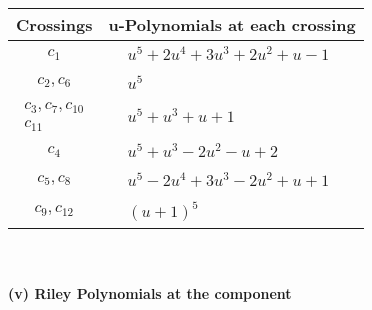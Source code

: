 \documentclass[1p]{elsarticle_modified}
\theoremstyle{definition}
\begin{document}
\begin{tabular}{m{50pt}|m{274pt}}
Crossings & \hspace{64pt}u-Polynomials at each crossing \\
\hline $$\begin{aligned}c_{1}\end{aligned}$$&$\begin{aligned}
&u^5+2 u^4+3 u^3+2 u^2+u-1
\end{aligned}$\\
\hline $$\begin{aligned}c_{2},c_{6}\end{aligned}$$&$\begin{aligned}
&u^5
\end{aligned}$\\
\hline $$\begin{aligned}c_{3},c_{7},c_{10}\\c_{11}\end{aligned}$$&$\begin{aligned}
&u^5+u^3+u+1
\end{aligned}$\\
\hline $$\begin{aligned}c_{4}\end{aligned}$$&$\begin{aligned}
&u^5+u^3-2 u^2- u+2
\end{aligned}$\\
\hline $$\begin{aligned}c_{5},c_{8}\end{aligned}$$&$\begin{aligned}
&u^5-2 u^4+3 u^3-2 u^2+u+1
\end{aligned}$\\
\hline $$\begin{aligned}c_{9},c_{12}\end{aligned}$$&$\begin{aligned}
&(u+1)^5
\end{aligned}$\\
\hline
\end{tabular}\\~\\
\newpage\renewcommand{\arraystretch}{1}
\flushleft \textbf{(v) Riley Polynomials at the component}\newline \\
\end{document}
